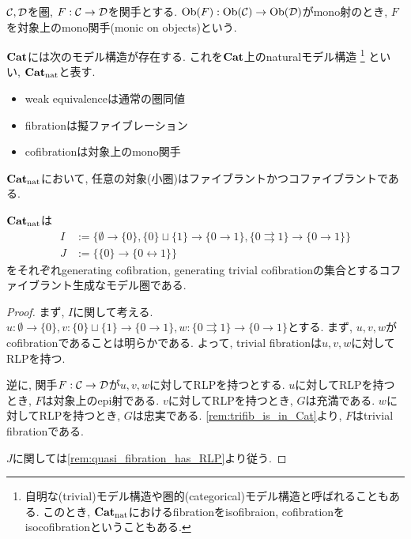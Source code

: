 \documentclass[uplatex, a4paper, 14Q, dvipdfmx]{jsarticle}
\begin{document}
\begin{definition}[対象上のmono関手]
  $\mathcal{C},\mathcal{D}$を圏, $F : \mathcal{C} \to \mathcal{D}$を関手とする. 
  $\mathrm{Ob}(F) : \mathrm{Ob}(\mathcal{C}) \to \mathrm{Ob}(\mathcal{D})$がmono射のとき, $F$を対象上のmono関手(monic on objects)という. 
\end{definition}

\begin{definition}[naturalモデル構造]
  $\mathbf{Cat}$には次のモデル構造が存在する. 
  これを$\mathbf{Cat}$上のnaturalモデル構造
  \footnote{
    自明な(trivial)モデル構造や圏的(categorical)モデル構造と呼ばれることもある.
    このとき, $\mathbf{Cat}_\mathrm{nat}$におけるfibrationをisofibraion, cofibrationをisocofibrationということもある. 
  }
  といい, $\mathbf{Cat}_\mathrm{nat}$と表す. 
  \begin{itemize}
    \item weak equivalenceは通常の圏同値
    \item fibrationは擬ファイブレーション
    \item cofibrationは対象上のmono関手
  \end{itemize}
\end{definition}

\begin{remark}
  $\mathbf{Cat}_\mathrm{nat}$において, 任意の対象(小圏)はファイブラントかつコファイブラントである. 
\end{remark}

\begin{remark}
  $\mathbf{Cat}_\mathrm{nat}$は
  \begin{align*}
    I &:= \{\emptyset \to \{0\}, \{0\} \sqcup \{1\} \to \{0 \to 1\}, \{0 \rightrightarrows 1\} \to \{0 \to 1\}\} \\
    J &:= \{\{0\} \to \{0 \leftrightarrow 1\}\}
  \end{align*}
  をそれぞれgenerating cofibration, generating trivial cofibrationの集合とするコファイブラント生成なモデル圏である. 
\end{remark}

\begin{proof}
  まず, $I$に関して考える. 
  $u : \emptyset \to \{0\}, v : \{0\} \sqcup \{1\} \to \{0 \to 1\}, w : \{0 \rightrightarrows 1\} \to \{0 \to 1\}$とする. 
  まず, $u,v,w$がcofibrationであることは明らかである. 
  よって, trivial fibrationは$u,v,w$に対してRLPを持つ. 

  逆に, 関手$F : \mathcal{C} \to \mathcal{D}$が$u,v,w$に対してRLPを持つとする. 
  $u$に対してRLPを持つとき, $F$は対象上のepi射である. 
  $v$に対してRLPを持つとき, $G$は充満である. 
  $w$に対してRLPを持つとき, $G$は忠実である.
  \cref{rem:trifib_is_in_Cat}より, $F$はtrivial fibrationである. 
  
  $J$に関しては\cref{rem:quasi_fibration_has_RLP}より従う. 
\end{proof}
\end{document}
